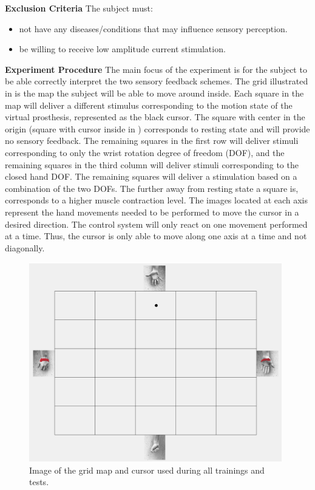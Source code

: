 \textbf{Exclusion Criteria}
The subject must:
\begin{itemize}
	\item not have any diseases/conditions that may influence sensory perception.
	\item be willing to receive low amplitude current stimulation. 
\end{itemize}


\textbf{{\Large Experiment Procedure}}
The main focus of the experiment is for the subject to be able correctly interpret the two sensory feedback schemes. The grid illustrated in  is the map the subject will be able to move around inside. Each square in the map will deliver a different stimulus corresponding to the motion state of the virtual prosthesis, represented as the black cursor. The square with center in the origin (square with cursor inside in ) corresponds to resting state and will provide no sensory feedback. The remaining squares in the first row will deliver stimuli corresponding to only the wrist rotation degree of freedom (DOF), and the remaining squares in the third column will deliver stimuli corresponding to the closed hand DOF. The remaining squares will deliver a stimulation based on a combination of the two DOFs. The further away from resting state a square is, corresponds to a higher muscle contraction level.
The images located at each axis represent the hand movements needed to be performed to move the cursor in a desired direction. The control system will only react on one movement performed at a time. Thus, the cursor is only able to move along one axis at a time and not diagonally.

\begin{figure}[H]                 
	\includegraphics[width=0.98\textwidth]{figures/gridmap}  
	\caption{Image of the grid map and cursor used during all trainings and tests.}
	\label{fig:gridmap} 
\end{figure}


